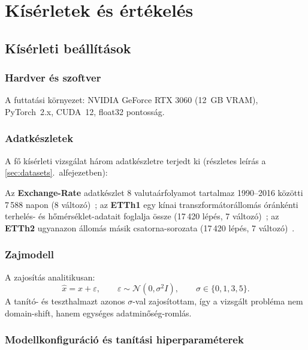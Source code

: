\chapter{Kísérletek és értékelés}
\label{ch:kiserletek}

\section{Kísérleti beállítások}
\label{sec:exp_setup}

\subsection{Hardver és szoftver}

A futtatási környezet: NVIDIA GeForce RTX 3060 (12~GB VRAM), PyTorch~2.x,
CUDA~12, float32 pontosság.

\subsection{Adatkészletek}
\label{sec:exp_datasets}

A fő kísérleti vizsgálat három adatkészletre terjedt ki (részletes leírás a
\ref{sec:datasets}.~alfejezetben):

Az \textbf{Exchange-Rate} adatkészlet 8 valutaárfolyamot tartalmaz
1990--2016 közötti 7\,588 napon (8 változó)~\cite{lai2018modeling};
az \textbf{ETTh1} egy kínai transzformátorállomás óránkénti terhelés-
és hőmérséklet-adatait foglalja össze (17\,420 lépés,
7 változó)~\cite{zhou2021informer}; az \textbf{ETTh2} ugyanazon
állomás másik csatorna-sorozata
(17\,420 lépés, 7 változó)~\cite{zhou2021informer}.


\subsection{Zajmodell}

A zajosítás analitikusan:
\begin{equation}
    \hat{x} = x + \varepsilon,\qquad
    \varepsilon \sim \mathcal{N}(0, \sigma^2 I),\qquad
    \sigma \in \{0, 1, 3, 5\}.
\end{equation}
A tanító- és teszthalmazt azonos $\sigma$-val zajosítottam, így a vizsgált
probléma nem domain-shift, hanem egységes adatminőség-romlás.

\subsection{Modellkonfiguráció és tanítási hiperparaméterek}

